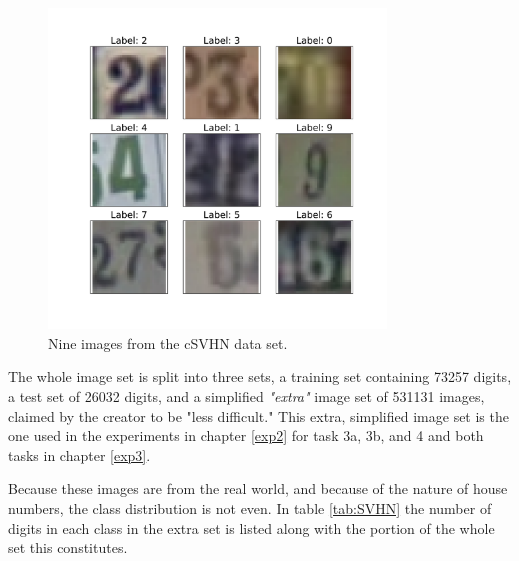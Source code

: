 \begin{figure}[p!]
    \centering
    \includegraphics[width=0.8\textwidth]{Chapters/3.Implementation/figures/cSVHN.pdf}
    \caption[cSVHN example]{Nine images from the cSVHN data set.}
    \label{fig:csvhn}
\end{figure}

The whole image set is split into three sets, a training set containing 73257 digits, a test set of 26032 digits, and a simplified \textit{"extra"} image set of 531131 images, claimed by the creator to be "less difficult." This extra, simplified image set is the one used in the experiments in chapter \ref{exp2} for task 3a, 3b, and 4 and both tasks in chapter \ref{exp3}.



Because these images are from the real world, and because of the nature of house numbers, the class distribution is not even. In table \ref{tab:SVHN} the number of digits in each class in the extra set is listed along with the portion of the whole set this constitutes.  
